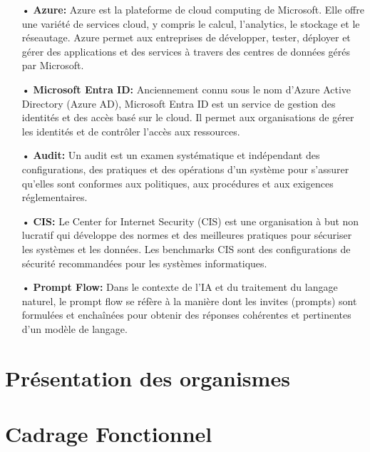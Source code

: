 \documentclass[a4paper]{report}
\begin{document}
\begin{doublespace}
\begin{itemize}
    \item[•] \textbf{Azure:} Azure est la plateforme de cloud computing de Microsoft. Elle offre une variété de services cloud, y compris le calcul, l'analytics, le stockage et le réseautage. Azure permet aux entreprises de développer, tester, déployer et gérer des applications et des services à travers des centres de données gérés par Microsoft.
    
    \item[•] \textbf{Microsoft Entra ID:} Anciennement connu sous le nom d'Azure Active Directory (Azure AD), Microsoft Entra ID est un service de gestion des identités et des accès basé sur le cloud. Il permet aux organisations de gérer les identités et de contrôler l'accès aux ressources.
    
    \item[•] \textbf{Audit:} Un audit est un examen systématique et indépendant des configurations, des pratiques et des opérations d'un système pour s'assurer qu'elles sont conformes aux politiques, aux procédures et aux exigences réglementaires.
    
    \item[•] \textbf{CIS:} Le Center for Internet Security (CIS) est une organisation à but non lucratif qui développe des normes et des meilleures pratiques pour sécuriser les systèmes et les données. Les benchmarks CIS sont des configurations de sécurité recommandées pour les systèmes informatiques.
    
    \item[•] \textbf{Prompt Flow:} Dans le contexte de l'IA et du traitement du langage naturel, le prompt flow se réfère à la manière dont les invites (prompts) sont formulées et enchaînées pour obtenir des réponses cohérentes et pertinentes d'un modèle de langage.

	\end{itemize}

    \newpage
    
	 \setcounter{page}{1}
	\chapter{Présentation des organismes}
	\fancyhead[L]{\hspace*{5cm}}
	

	\chapter{Cadrage Fonctionnel}
	\fancyhead[L]{\hspace*{5cm}}
	


\end{doublespace}
\end{document}
